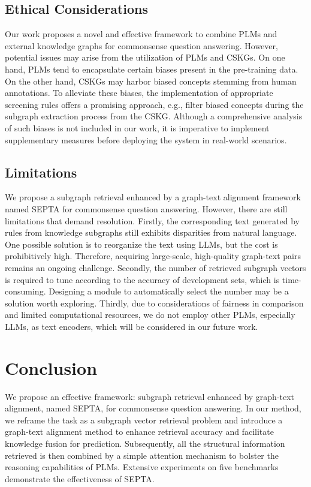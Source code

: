 \documentclass[runningheads]{llncs}
\begin{document}
\subsection{Ethical Considerations}
Our work proposes a novel and effective framework to combine PLMs and external knowledge graphs for commonsense question answering. However, potential issues may arise from the utilization of PLMs and CSKGs. On one hand, PLMs tend to encapsulate certain biases present in the pre-training data. On the other hand, CSKGs may harbor biased concepts stemming from human annotations. To alleviate these biases, the implementation of appropriate screening rules offers a promising approach, e.g., filter biased concepts during the subgraph extraction process from the CSKG. Although a comprehensive analysis of such biases is not included in our work, it is imperative to implement supplementary measures before deploying the system in real-world scenarios.

\subsection{Limitations}
We propose a subgraph retrieval enhanced by a graph-text alignment framework named SEPTA for commonsense question answering. However, there are still limitations that demand resolution. Firstly, the corresponding text generated by rules from knowledge subgraphs still exhibits disparities from natural language. One possible solution is to reorganize the text using LLMs, but the cost is prohibitively high. Therefore, acquiring large-scale, high-quality graph-text pairs remains an ongoing challenge. Secondly, the number of retrieved subgraph vectors is required to tune according to the accuracy of development sets, which is time-consuming. Designing a module to automatically select the number may be a solution worth exploring. Thirdly, due to considerations of fairness in comparison and limited computational resources, we do not employ other PLMs, especially LLMs, as text encoders, which will be considered in our future work.

\section{Conclusion}
We propose an effective framework: subgraph retrieval enhanced by graph-text alignment, named SEPTA, for commonsense question answering. In our method, we reframe the task as a subgraph vector retrieval problem and introduce a graph-text alignment method to enhance retrieval accuracy and facilitate knowledge fusion for prediction. Subsequently, all the structural information retrieved is then combined by a simple attention mechanism to bolster the reasoning capabilities of PLMs. Extensive experiments on five benchmarks demonstrate the effectiveness of SEPTA.
\end{document}
